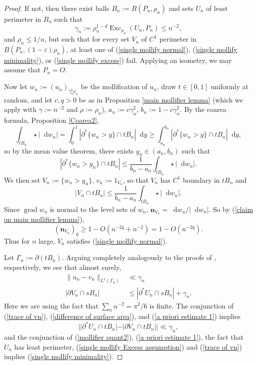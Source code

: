 \documentclass[final,12pt, leqno]{brownthesis}
\DeclareMathOperator{\Exc}{Exc}
\newcommand*\dif{\mathop{}\!\mathrm{d}}
\DeclareMathOperator{\grad}{grad}
\newcommand{\normal}{\mathbf n}
\theoremstyle{definition}
\numberwithin{equation}{section}
\begin{document}
\begin{proof}
If not, then there exist balls $B_n := B(P_n, \rho_n)$ and sets $U_n$ of least perimeter in $B_n$ such that
\begin{equation}\label{single mollify Excess assumption}
\gamma_n := \rho_n^{1 - d} \Exc_{\rho_n} (U_n, P_n) \leq n^{-2},
\end{equation}
and $\rho_n \leq 1/n$, but such that for every set $V_n$ of $C^1$ perimeter in $B(P_n, (1 - \varepsilon) \rho_n)$, at least one of (\ref{single mollify normal}), (\ref{single mollify minimality}), or (\ref{single mollify excess}) fail.
Applying an isometry, we may assume that $P_n = O$.

Now let $w_n := (u_n)_{\gamma_n^4 \rho_n}$ be the mollification of $u_n$, draw $t \in [0, 1]$ uniformly at random, and let $c, q > 0$ be as in Proposition \ref{main mollifier lemma} (which we apply with $\gamma := n^{-2}$ and $\rho := \rho_n$), $a_n := c\gamma_n^2$, $b_n := 1 - c\gamma_n^2$.
By the coarea formula, Proposition \ref{Coarea2},
$$\int_{tB_n} \star |\dif w_n| = \int_0^1 |\partial^* \{w_n > y\} \cap tB_n| \dif y \geq \int_{a_n}^{b_n} |\partial^* \{w_n > y\} \cap tB_n| \dif y,$$
so by the mean value theorem, there exists $y_n \in (a_n, b_n)$ such that
$$|\partial^* \{w_n > y_n\} \cap tB_n| \leq \frac{1}{b_n - a_n} \int_{tB_n} \star |\dif w_n|.$$
We then set $V_n := \{w_n > y_n\}$, $v_n := 1_{V_n}$, so that $V_n$ has $C^1$ boundary in $tB_n$ and
\begin{equation}\label{MVT mollifier}
|V_n \cap tB_n| \leq \frac{1}{b_n - a_n} \int_{tB_n} \star |\dif w_n|.
\end{equation}
Since $\grad w_n$ is normal to the level sets of $w_n$, $\normal_{V_n} = \dif w_n/|\dif w_n|$.
So by (\ref{claim on main mollifier lemma}),
$$(\normal_{V_n})_0 \geq 1 - O(n^{-2q} + n^{-2}) = 1 - O(n^{-2q}).$$
Thus for $n$ large, $V_n$ satisfies (\ref{single mollify normal}).

Let $\Gamma_n := \partial(tB_n)$.
Arguing completely analogously to the proofs of \cite[(7.23), (7.22)]{Giusti77}, respectively, we see that almost surely,
\begin{align}
\|u_n - v_n\|_{L^1(\Gamma_n)} &\ll \gamma_n \label{trace of vn} \\
|\partial V_n \cap sB_n| &\leq |\partial^* U_n \cap sB_n| + \gamma_n. \label{difference of surface area}
\end{align}
Here we are using the fact that $\sum_n n^{-2} = \pi^2/6$ is finite.
The conjunction of (\ref{trace of vn}), (\ref{difference of surface area}), and (\ref{a priori estimate 1}) implies
\begin{equation}
||\partial^* U_n \cap tB_n| - |\partial V_n \cap tB_n|| \ll \gamma_n, \label{mollifier quant2}
\end{equation}
and the conjunction of (\ref{mollifier quant2}), (\ref{a priori estimate 1}), the fact that $U_n$ has least perimeter, (\ref{single mollify Excess assumption}) and (\ref{trace of vn}) implies (\ref{single mollify minimality}).


\end{proof}
\end{document}
